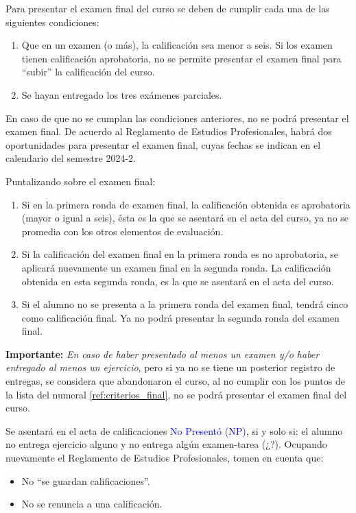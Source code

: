Para presentar el examen final del curso se deben de cumplir cada una de las siguientes condiciones:
\begin{enumerate}\label{ref:criterios_final}
\item Que en un examen (o más), la calificación sea menor a seis. Si los examen tienen calificación aprobatoria, no se permite presentar el examen final para \enquote{subir} la calificación del curso.
\item Se hayan entregado los tres exámenes parciales.
\end{enumerate}
En caso de que no se cumplan las condiciones anteriores, no se podrá presentar el examen final. De acuerdo al Reglamento de Estudios Profesionales, habrá dos oportunidades para presentar el examen final, cuyas fechas se indican en el calendario del semestre 2024-2.
\par
Puntalizando sobre el examen final:
\begin{enumerate}[label=\roman*)]
\item Si en la primera ronda de examen final, la calificación obtenida es aprobatoria (mayor o igual a seis), ésta es la que se asentará en el acta del curso, ya no se promedia con los otros elementos de evaluación.
\item Si la calificación del examen final en la primera ronda es no aprobatoria, se aplicará nuevamente un examen final en la segunda ronda. La calificación obtenida en esta segunda ronda, es la que se asentará en el acta del curso.
\item Si el alumno no se presenta a la primera ronda del examen final, tendrá cinco como calificación final. Ya no podrá presentar la segunda ronda del examen final.
\end{enumerate}
\par
\textbf{Importante: } \emph{En caso de haber presentado al menos un examen y/o haber entregado al menos un ejercicio}, pero si ya no se tiene un posterior registro de entregas, se considera que abandonaron el curso, al no cumplir con los puntos de la lista del numeral \ref{ref:criterios_final}, no se podrá presentar el examen final del curso.
\par
Se asentará en el acta de calificaciones \textcolor{blue}{No Presentó (NP)}, si y solo si: el alumno no entrega ejercicio alguno y no entrega algún examen-tarea (¿?). Ocupando nuevamente el Reglamento de Estudios Profesionales, tomen en cuenta que:
\begin{itemize}
\setlength\itemsep{1pt}
\item No \enquote{se guardan calificaciones}.
\item No se renuncia a una calificación.
\end{itemize}

